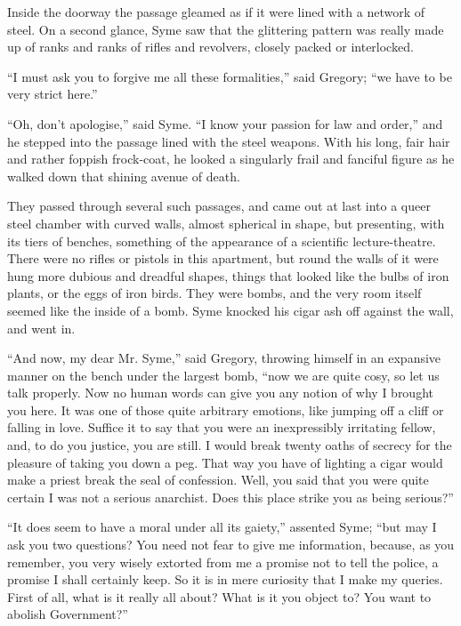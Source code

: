 Inside the doorway the passage gleamed as if it were lined with a network of steel. On a second glance, Syme saw that the glittering pattern was really made up of ranks and ranks of rifles and revolvers, closely packed or interlocked.

“I must ask you to forgive me all these formalities,” said Gregory; “we have to be very strict here.”

“Oh, don’t apologise,” said Syme. “I know your passion for law and order,” and he stepped into the passage lined with the steel weapons. With his long, fair hair and rather foppish frock-coat, he looked a singularly frail and fanciful figure as he walked down that shining avenue of death.

They passed through several such passages, and came out at last into a queer steel chamber with curved walls, almost spherical in shape, but presenting, with its tiers of benches, something of the appearance of a scientific lecture-theatre. There were no rifles or pistols in this apartment, but round the walls of it were hung more dubious and dreadful shapes, things that looked like the bulbs of iron plants, or the eggs of iron birds. They were bombs, and the very room itself seemed like the inside of a bomb. Syme knocked his cigar ash off against the wall, and went in.

“And now, my dear Mr. Syme,” said Gregory, throwing himself in an expansive manner on the bench under the largest bomb, “now we are quite cosy, so let us talk properly. Now no human words can give you any notion of why I brought you here. It was one of those quite arbitrary emotions, like jumping off a cliff or falling in love. Suffice it to say that you were an inexpressibly irritating fellow, and, to do you justice, you are still. I would break twenty oaths of secrecy for the pleasure of taking you down a peg. That way you have of lighting a cigar would make a priest break the seal of confession. Well, you said that you were quite certain I was not a serious anarchist. Does this place strike you as being serious?”

“It does seem to have a moral under all its gaiety,” assented Syme; “but may I ask you two questions? You need not fear to give me information, because, as you remember, you very wisely extorted from me a promise not to tell the police, a promise I shall certainly keep. So it is in mere curiosity that I make my queries. First of all, what is it really all about? What is it you object to? You want to abolish Government?”

